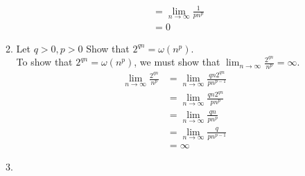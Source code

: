 \documentclass{article}
\begin{document}
\begin{enumerate}
\begin{enumerate}[label=\arabic*.]
\begin{align*}
                                                                & = \lim_{n \to \infty}{\frac{1}{pn^p}}               \\
                                                                & = 0
                    \end{align*}
              \item Let \(q > 0, p > 0\) Show that \(2^{qn} = \omega(n^p)\). \\
                    To show that \(2^{qn} = \omega(n^p)\), we must show that \(\lim_{n \to \infty}{\frac{2^{qn}}{n^p}} = \infty\).
                    \begin{align*}
                        \lim_{n \to \infty} \frac{2^{qn}}{n^p} & = \lim_{n \to \infty} \frac{qn2^{qn}}{pn^{p-1}} \\
                                                               & = \lim_{n \to \infty} \frac{qn2^{qn}}{pn^p}     \\
                                                               & = \lim_{n \to \infty} \frac{qn}{pn^p}           \\
                                                               & = \lim_{n \to \infty} \frac{q}{pn^{p-1}}        \\
                                                               & = \infty
                    \end{align*}
              \item \begin{figure}
                        \centering
\end{figure}
\end{enumerate}
\end{enumerate}
\end{document}
